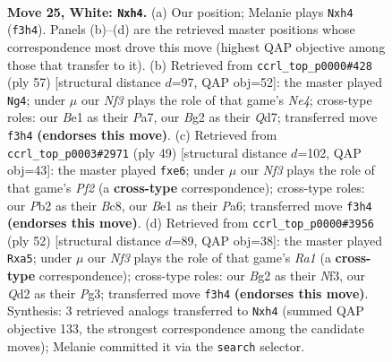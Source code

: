 \documentclass[11pt]{article}
\begin{document}
\clearpage

\begin{figure}[p]\centering
\begin{subfigure}{0.46\textwidth}\centering
\resizebox{\linewidth}{!}{%
\newchessgame
\chessboard[
  setfen={4k2r/4q3/5p2/2pp4/3n2bp/1p3N2/1P1QPPB1/K3B2R w k - 0 25},
  showmover=false,
  pgfstyle=straightmove, color=movearrow, markmove={f3-h4}
]}
\caption{}
\end{subfigure}\hfill
\begin{subfigure}{0.46\textwidth}\centering
\resizebox{\linewidth}{!}{%
\newchessgame
\chessboard[
  setfen={8/pp1q2pk/1b3r1B/3pn2P/PP1N4/2P3Q1/6P1/4R1K1 b - - 0 29},
  showmover=false,
  pgfstyle=straightmove, color=movearrow, markmove={e5-g4}
]}
\caption{}
\end{subfigure}
\\[4pt]
\begin{subfigure}{0.46\textwidth}\centering
\resizebox{\linewidth}{!}{%
\newchessgame
\chessboard[
  setfen={1rb5/2k1qp2/p1n1P3/1pNp3p/8/P3Q3/1PP3B1/1K1R4 b - - 0 25},
  showmover=false,
  pgfstyle=straightmove, color=movearrow, markmove={f7-e6}
]}
\caption{}
\end{subfigure}\hfill
\begin{subfigure}{0.46\textwidth}\centering
\resizebox{\linewidth}{!}{%
\newchessgame
\chessboard[
  setfen={4q1k1/2p3p1/p1nbp2p/r7/3BQ3/2P2NPP/5P2/R5K1 w - - 0 27},
  showmover=false,
  pgfstyle=straightmove, color=movearrow, markmove={a1-a5}
]}
\caption{}
\end{subfigure}
\caption{\textbf{Move 25, White: \texttt{Nxh4}.} (a) Our position; Melanie plays \texttt{Nxh4} (\texttt{f3h4}). Panels (b)--(d) are the retrieved master positions whose correspondence most drove this move (highest QAP objective among those that transfer to it). (b) Retrieved from \texttt{ccrl\_top\_p0000\#428} (ply 57) [structural distance $d$=97, QAP obj=52]: the master played \texttt{Ng4}; under $\mu$ our \emph{Nf3} plays the role of that game's \emph{Ne4}; cross-type roles: our \emph{B}e1 as their \emph{P}a7, our \emph{B}g2 as their \emph{Q}d7; transferred move \texttt{f3h4} \textbf{(endorses this move)}. (c) Retrieved from \texttt{ccrl\_top\_p0003\#2971} (ply 49) [structural distance $d$=102, QAP obj=43]: the master played \texttt{fxe6}; under $\mu$ our \emph{Nf3} plays the role of that game's \emph{Pf2} (a \textbf{cross-type} correspondence); cross-type roles: our \emph{P}b2 as their \emph{B}c8, our \emph{B}e1 as their \emph{P}a6; transferred move \texttt{f3h4} \textbf{(endorses this move)}. (d) Retrieved from \texttt{ccrl\_top\_p0000\#3956} (ply 52) [structural distance $d$=89, QAP obj=38]: the master played \texttt{Rxa5}; under $\mu$ our \emph{Nf3} plays the role of that game's \emph{Ra1} (a \textbf{cross-type} correspondence); cross-type roles: our \emph{B}g2 as their \emph{N}f3, our \emph{Q}d2 as their \emph{P}g3; transferred move \texttt{f3h4} \textbf{(endorses this move)}. Synthesis: 3 retrieved analogs transferred to \texttt{Nxh4} (summed QAP objective 133, the strongest correspondence among the candidate moves); Melanie committed it via the \texttt{search} selector.}
\label{fig:thought-m48}
\end{figure}
\end{document}

